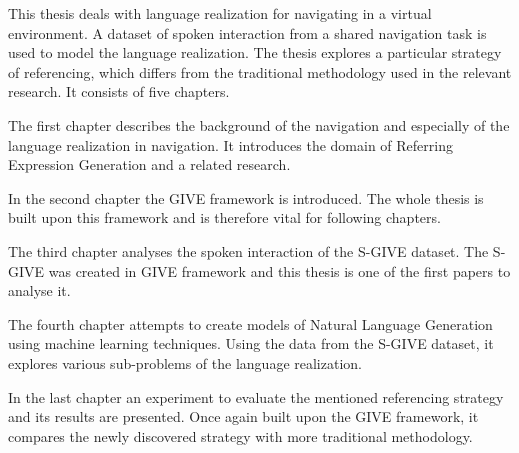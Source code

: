 This thesis deals with language realization for navigating in a virtual environment. A dataset of spoken interaction from a shared navigation task is used to model the language realization. The thesis explores a particular strategy of referencing, which differs from the traditional methodology used in the relevant research. It consists of five chapters.

The first chapter describes the background of the navigation and especially of the language realization in navigation. It introduces the domain of Referring Expression Generation and a related research.

In the second chapter the GIVE framework is introduced. The whole thesis is built upon this framework and is therefore vital for following chapters. 

The third chapter analyses the spoken interaction of the S-GIVE dataset. The S-GIVE was created in GIVE framework and this thesis is one of the first papers to analyse it.

The fourth chapter attempts to create models of Natural Language Generation using machine learning techniques. Using the data from the S-GIVE dataset, it explores various sub-problems of the language realization.

In the last chapter an experiment to evaluate the mentioned referencing strategy and its results are presented. Once again built upon the GIVE framework, it compares the newly discovered strategy with more traditional methodology.   